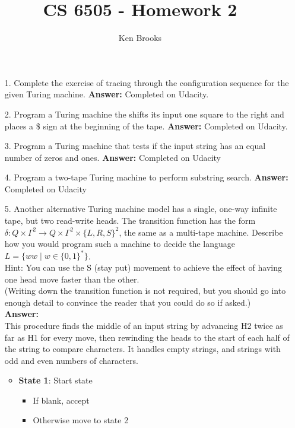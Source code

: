 \documentclass[12pt]{article}
\title{CS 6505 - Homework 2}
\author{Ken Brooks}
\begin{document}
\begin{itemize}
\item[{\rm 1.}] Complete the exercise of tracing through the configuration sequence for the given Turing machine. \textbf{Answer:} Completed on Udacity.
\vspace{.2in}
\item[{\rm 2.}] Program a Turing machine the shifts its input one square to the right and places a \$ sign at the beginning of the tape. \textbf{Answer:} Completed on Udacity.

	\vspace{.2in}
\item[{\rm 3.}] Program a Turing machine that tests if the input string has an equal number of zeros and ones. \textbf{Answer:} Completed on Udacity
	\vspace{.2in} 
\item[{\rm 4.}] Program a two-tape Turing machine to perform substring search. \textbf{Answer:} Completed on Udacity
\vspace{.2in}
\item[{\rm 5.}] Another alternative Turing machine model has a single, one-way infinite tape, but two read-write heads.  The transition function has the form $\delta:Q\times\Gamma^{2}\rightarrow Q\times\Gamma^{2}\times\{L,R,S\}^{2}$, the same as a multi-tape machine.  Describe how you would program such a machine to decide the language $L=\{ww \mid w \in\{0,1\}^{*}\}$. 
	\\[.2in]Hint: You can use the S (stay put) movement to achieve the effect of having one head move faster than the other. 
	\\[.2in](Writing down the transition function is not required, but you should go into enough detail to convince the reader that you could do so if asked.)
	\\[.2in]\textbf{Answer:}
	\\[.2in] This procedure finds the middle of an input string by advancing H2 twice as far as H1 for every move, then rewinding the heads to the start of each half of the string to compare characters.  It handles empty strings, and strings with odd and even numbers of characters.
	\vspace{.2in}
	\begin{itemize}
	\item \textbf{State 1}: Start state
	\begin{itemize}
	\item If blank, accept
	\item Otherwise move to state 2

\end{itemize}
\end{itemize}
\end{itemize}
\end{document}
